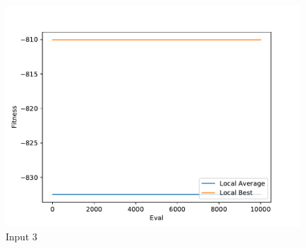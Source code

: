 \documentclass{standalone}
\begin{document}
\begin{figure}[!htb]
	\caption{Input 3}
	\label{fig:graph_3044}
	\includegraphics[width=\textwidth]{../graphs/graphs/3044.pdf}
\end{figure}
\end{document}
